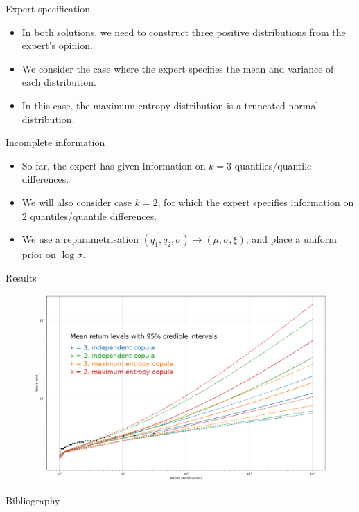 \documentclass[10pt]{beamer}
\begin{document}
%
%
\begin{frame}{Expert specification}{}
%

%
\begin{itemize}
	\item In both solutions, we need to construct three positive distributions
		from the expert's opinion.
	\item We consider the case where the expert specifies
		the mean and variance of each distribution.
	\item In this case, the maximum entropy distribution
		is a truncated normal distribution.
\end{itemize}

%
%
\end{frame}
%
%
\begin{frame}{Incomplete information}{}
%
\begin{itemize}
	\item So far, the expert has given information on $k = 3$
		quantiles/quantile differences. 
	\item We will also consider case $k = 2$, for which the expert
		specifies information on $2$ quantiles/quantile differences.
	\item We use a reparametrisation
		$(q_1, q_2, \sigma) \to (\mu, \sigma, \xi)$,
		and place a uniform prior on $\log \sigma$.
\end{itemize}
%
\end{frame}
%
%
\begin{frame}{Results}{}
%
\begin{figure}
	\centering
	\includegraphics[width=\linewidth]{plots/rl_text.pdf}
\end{figure}
%
\end{frame}
%
%
\begin{frame}{Bibliography}{}
%
\printbibliography
\end{frame}
%
%
\end{document}
